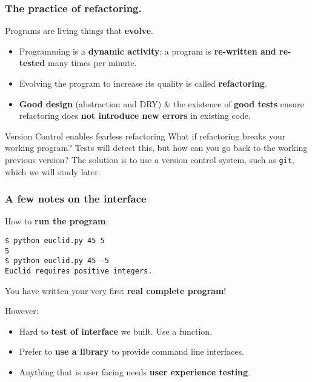 \documentclass{beamer} %
\newcommand\emc[1]{\textcolor{brightblue}{\textbf{#1}}}
\begin{document}
\begin{frame}
\frametitle{The practice of refactoring.}

Programs are living things that \emc{evolve}.
\begin{itemize}
\item Programming is a \emc{dynamic activity}: a program is \emc{re-written and re-tested} many times per minute.
\item Evolving the program to increase its quality is called \emc{refactoring}.
\item \emc{Good design} (abstraction and DRY) \& the existence of \emc{good tests} ensure refactoring does \emc{not introduce new errors} in existing code.
\end{itemize}

\begin{block}{Version Control enables fearless refactoring}
What if refactoring breaks your working program? Tests will detect this, but how can you go back to the working previous version? The solution is to use a version control system, such as \texttt{git}, which we will study later.
\end{block}

\end{frame}


\begin{frame}[fragile]
\frametitle{A few notes on the interface}

How to \emc{run the program}:
\begin{center}
\begin{Verbatim}[fontsize=\scriptsize]
$ python euclid.py 45 5
5
$ python euclid.py 45 -5
Euclid requires positive integers.
\end{Verbatim}
\end{center}
You have written your very first \emc{real complete program}!

\vspace{3mm}
However:
\begin{itemize}
	\item Hard to \emc{test of interface} we built. Use a function.
	\item Prefer to \emc{use a library} to provide command line interfaces.
	\item Anything that is user facing needs \emc{user experience testing}.
\end{itemize}

\end{frame}
\end{document}
